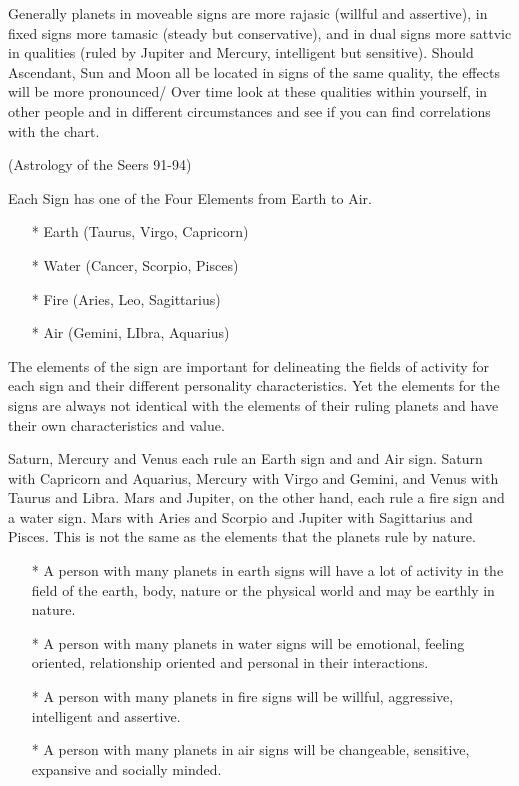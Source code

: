  

Generally planets in moveable signs are more rajasic (willful and assertive), in fixed signs more tamasic (steady but conservative), and in dual signs more sattvic in qualities (ruled by Jupiter and Mercury, intelligent but sensitive). Should Ascendant, Sun and Moon all be located in signs of the same quality, the effects will be more pronounced/ Over time look at these qualities within yourself, in other people and in different circumstances and see if you can find  correlations with the chart.

 

 (Astrology of the Seers 91-94)

 

Each Sign has one of the Four Elements from Earth to Air.

 

\begin{enumerate}
\item[*] Earth (Taurus, Virgo, Capricorn)
\item[*] Water (Cancer, Scorpio, Pisces)
\item[*] Fire (Aries, Leo, Sagittarius)
\item[*] Air (Gemini, LIbra, Aquarius)
 \end{enumerate}

The elements of the sign are important for delineating the fields of activity for each sign and their different personality characteristics. Yet the elements for the signs are always not identical with the elements of their ruling planets and have their own characteristics and value.

Saturn, Mercury and Venus each rule an Earth sign and and Air sign. Saturn with Capricorn and Aquarius, Mercury with Virgo and Gemini, and Venus with Taurus and Libra. Mars and Jupiter, on the other hand, each rule a fire sign and a water sign. Mars with Aries and Scorpio and Jupiter with Sagittarius and Pisces. This is not the same as the elements that the planets rule by nature.

 

\begin{enumerate}
\item[*] A person with many planets in earth signs will have a lot of activity in the field of the earth, body, nature or the physical world and may be earthly in nature.
\item[*] A person with many planets in water signs will be emotional, feeling oriented, relationship oriented and personal in their interactions.
\item[*] A person with many planets in fire signs will be willful, aggressive, intelligent and assertive.
\item[*] A person with many planets in air signs will be changeable, sensitive, expansive and socially minded.
  \end{enumerate}

